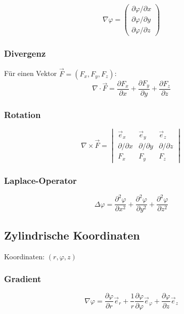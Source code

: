 \documentclass[a4paper]{article}
\begin{document}
\[
\nabla \varphi =
\begin{pmatrix}
\partial \varphi / \partial x \\
\partial \varphi / \partial y \\
\partial \varphi / \partial z
\end{pmatrix}
\]

\subsubsection{Divergenz}

Für einen Vektor $\vec F = (F_x,F_y,F_z)$:
\[
\nabla \cdot \vec F =
\frac{\partial F_x}{\partial x}
+\frac{\partial F_y}{\partial y}
+\frac{\partial F_z}{\partial z}
\]

\subsubsection{Rotation}

\[
\nabla \times \vec F =
\begin{vmatrix}
\vec e_x & \vec e_y & \vec e_z \\
\partial/\partial x & \partial/\partial y & \partial/\partial z \\
F_x & F_y & F_z
\end{vmatrix}
\]

\subsubsection{Laplace-Operator}

\[
\Delta \varphi =
\frac{\partial^2 \varphi}{\partial x^2}
+\frac{\partial^2 \varphi}{\partial y^2}
+\frac{\partial^2 \varphi}{\partial z^2}
\]

\subsection{Zylindrische Koordinaten}

Koordinaten: $(r,\varphi,z)$

\subsubsection{Gradient}

\[
\nabla \varphi =
\frac{\partial \varphi}{\partial r}\vec e_r
+\frac{1}{r}\frac{\partial \varphi}{\partial \varphi}\vec e_\varphi
+\frac{\partial \varphi}{\partial z}\vec e_z
\]
\end{document}
